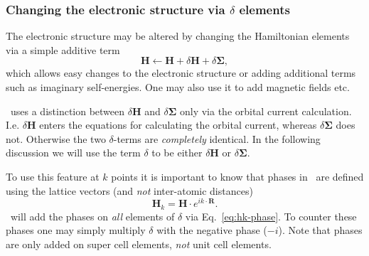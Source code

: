 \subsubsection{Changing the electronic structure via
    \texorpdfstring{$\delta$}{d} elements}

\newcommand\dH{\delta\mathbf H}
\newcommand\dSE{\delta\mathbf\Sigma}

The electronic structure may be altered by changing the Hamiltonian
elements via a simple additive term
\begin{equation}
  \mathbf H \leftarrow \mathbf H + \dH + \dSE,
\end{equation}
which allows easy changes to the electronic structure or adding
additional terms such as imaginary self-energies. One may also use it
to add magnetic fields etc.

\tbtrans\ uses a distinction between $\dH$ and $\dSE$ only via the
orbital current calculation. I.e. $\dH$ enters the equations for
calculating the orbital current, whereas $\dSE$ does not. Otherwise
the two $\delta$-terms are \emph{completely} identical. In the
following discussion we will use the term $\delta$ to be either $\dH$
or $\dSE$.

To use this feature at $k$ points it is important to know that phases
in \tbtrans\ are defined using the lattice vectors (and \emph{not}
inter-atomic distances)
\begin{equation}
  \mathbf H_k = \mathbf H \cdot e^{i k \cdot \mathbf R}.
  \label{eq:hk-phase}
\end{equation}
\tbtrans\ will add the phases on \emph{all} elements of $\delta$ via
Eq.~\eqref{eq:hk-phase}. To counter these phases one may simply
multiply $\delta$ with the negative phase ($-i$). Note that phases are
only added on super cell elements, \emph{not} unit cell elements.


